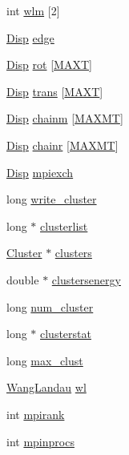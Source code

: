 \begin{DoxyCompactItemize}
\item 
int \hyperlink{struct_sim_a43570c2d1a73631e8c00f5512a8486b6}{wlm} \mbox{[}2\mbox{]}
\item 
\hyperlink{struct_disp}{Disp} \hyperlink{struct_sim_a1880ddedceb3460fd343d0f847032fdf}{edge}
\item 
\hyperlink{struct_disp}{Disp} \hyperlink{struct_sim_a434d5b10fc6a3bf6fec51eaaf9ff83cb}{rot} \mbox{[}\hyperlink{macros_8h_a3f79fdecc884eb98c97d1bdc77455295}{M\+A\+X\+T}\mbox{]}
\item 
\hyperlink{struct_disp}{Disp} \hyperlink{struct_sim_a72db680d42b459fad8362d37914ae9a8}{trans} \mbox{[}\hyperlink{macros_8h_a3f79fdecc884eb98c97d1bdc77455295}{M\+A\+X\+T}\mbox{]}
\item 
\hyperlink{struct_disp}{Disp} \hyperlink{struct_sim_a7daf59f4e267bb80f1db9c607a0858ff}{chainm} \mbox{[}\hyperlink{macros_8h_ad002a98462c90c52983b122ab9e2059a}{M\+A\+X\+M\+T}\mbox{]}
\item 
\hyperlink{struct_disp}{Disp} \hyperlink{struct_sim_adec41082dfe3aa3210a1fbc5f0ade382}{chainr} \mbox{[}\hyperlink{macros_8h_ad002a98462c90c52983b122ab9e2059a}{M\+A\+X\+M\+T}\mbox{]}
\item 
\hyperlink{struct_disp}{Disp} \hyperlink{struct_sim_a791a3f584b47c7a687be95b636a3528c}{mpiexch}
\item 
long \hyperlink{struct_sim_ae3f308ef99bae8099bb581b89618ba09}{write\+\_\+cluster}
\item 
long $\ast$ \hyperlink{struct_sim_a1feddf9821ae3b1082ca29fd60adecca}{clusterlist}
\item 
\hyperlink{struct_cluster}{Cluster} $\ast$ \hyperlink{struct_sim_acb85dbc7776928fe57c9d46972946f70}{clusters}
\item 
double $\ast$ \hyperlink{struct_sim_a3603ca84a589c3539406b38d7aff2065}{clustersenergy}
\item 
long \hyperlink{struct_sim_abd86b808fdd2c02341e4dc8f7e877c12}{num\+\_\+cluster}
\item 
long $\ast$ \hyperlink{struct_sim_a6362e502149a7cd3ed9fb0b0e9a3593e}{clusterstat}
\item 
long \hyperlink{struct_sim_a61199ec6703bab63f3936d888b53ad26}{max\+\_\+clust}
\item 
\hyperlink{class_wang_landau}{Wang\+Landau} \hyperlink{struct_sim_ade98939300538c5d79e144d8c583b258}{wl}
\item 
int \hyperlink{struct_sim_ae308bc0b02dea185f040f25b16bbeed1}{mpirank}
\item 
int \hyperlink{struct_sim_a94c5eb8fae92f8803d17930fa29e40f2}{mpinprocs}
\end{DoxyCompactItemize}


